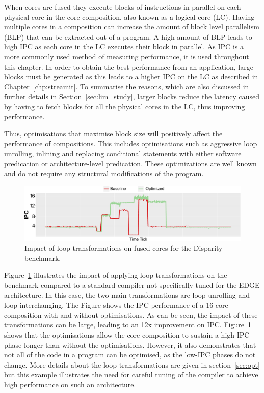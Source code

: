 When cores are fused they execute blocks of instructions in parallel on each physical core in the core composition, also known as a logical core (LC).
Having multiple cores in a composition can increase the amount of block level parallelism (BLP) that can be extracted out of a program.
A high amount of BLP leads to high IPC as each core in the LC executes their block in parallel.
As IPC is a more commonly used method of measuring performance, it is used throughout this chapter.
In order to obtain the best performance from an application, large blocks must be generated as this leads to a higher IPC on the LC as described in Chapter~\ref{chp:streamit}.
To summarise the reasons, which are also discussed in further details in Section~\ref{sec:lim_study}, larger blocks reduce the latency caused by having to fetch blocks for all the physical cores in the LC, thus improving performance.

Thus, optimisations that maximise block size will positively affect the performance of compositions.
This includes optimisations such as aggressive loop unrolling, inlining and replacing conditional statements with either software predication or architecture-level predication.
These optimizations are well known and do not require any structural modifications of the program.

\begin{figure}[t]
    \includegraphics[width=\textwidth]{cases-paper/graphics/motivation/code_opt_3.pdf}
    \caption{Impact of loop transformations on fused cores for the Disparity benchmark.} 
    \label{fig:compmotiv}
\vspace{1em}
\end{figure}

Figure~\ref{fig:compmotiv} illustrates the impact of applying loop transformations on the  benchmark compared to a standard compiler not specifically tuned for the EDGE architecture.
In this case, the two main transformations are loop unrolling and loop interchanging.
The Figure shows the IPC performance of a 16 core composition with and without optimisations.
As can be seen, the impact of these transformations can be large, leading to an 12x improvement on IPC.
Figure~\ref{fig:compmotiv} shows that the optimisations allow the core-composition to sustain a high IPC phase longer than without the optimisations.
However, it also demonstrates that not all of the code in a program can be optimised, as the low-IPC phases do not change.
More details about the loop transformations are given in section~\ref{sec:opt} but this example illustrates the need for careful tuning of the compiler to achieve high performance on such an architecture.

